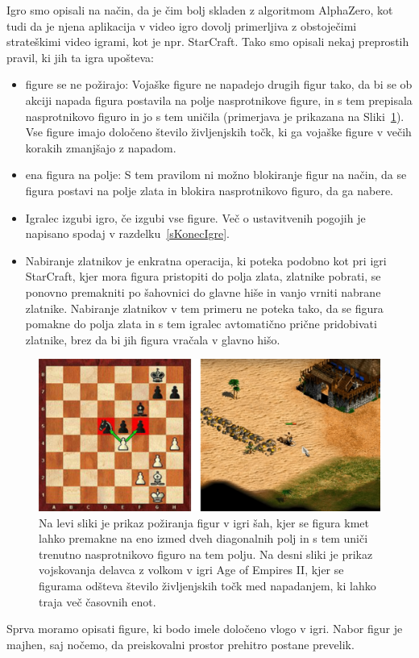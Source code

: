 \documentclass[a4paper, 12pt]{book}
\begin{document}
{Igro smo opisali na način, da je čim bolj skladen z algoritmom AlphaZero, kot tudi da je njena aplikacija v video igro dovolj primerljiva z obstoječimi strateškimi video igrami, kot je npr. StarCraft.
Tako smo opisali nekaj preprostih pravil, ki jih ta igra upošteva:
\begin{itemize}
	\item figure se ne požirajo: Vojaške figure ne napadejo drugih figur tako, da bi se ob akciji napada figura postavila na polje nasprotnikove figure, in s tem prepisala nasprotnikovo figuro in jo s tem uničila (primerjava je prikazana na Sliki~\ref{picPoziranjeFigur}). 
	Vse figure imajo določeno število življenjskih točk, ki ga vojaške figure v večih korakih zmanjšajo z napadom.
	\item ena figura na polje: S tem pravilom ni možno blokiranje figur na način, da se figura postavi na polje zlata in blokira nasprotnikovo figuro, da ga nabere.
	\item Igralec izgubi igro, če izgubi vse figure. Več o ustavitvenih pogojih je napisano spodaj v razdelku~\ref{sKonecIgre}.
	\item Nabiranje zlatnikov je enkratna operacija, ki poteka podobno kot pri igri StarCraft, kjer mora figura pristopiti do polja zlata, zlatnike pobrati, se ponovno premakniti po šahovnici do glavne hiše in vanjo vrniti nabrane zlatnike.
	Nabiranje zlatnikov v tem primeru ne poteka tako, da se figura pomakne do polja zlata in s tem igralec avtomatično prične pridobivati zlatnike, brez da bi jih figura vračala v glavno hišo.
\end{itemize}

\begin{figure}[h!]
	\begin{center}
		\includegraphics[width=1\textwidth]{photos/horizontal_health.pdf}
	\end{center}
	\caption{Na levi sliki je prikaz požiranja figur v igri šah, kjer se figura kmet lahko premakne na eno izmed dveh diagonalnih polj in s tem uniči trenutno nasprotnikovo figuro na tem polju. 
		Na desni sliki je prikaz vojskovanja delavca z volkom v igri Age of Empires II, kjer se figurama odšteva število življenjskih točk med napadanjem, ki lahko traja več časovnih enot. }
	\label{picPoziranjeFigur}
\end{figure}
\noindent
Sprva moramo opisati figure, ki bodo imele določeno vlogo v igri. 
Nabor figur je majhen, saj nočemo, da preiskovalni prostor prehitro postane prevelik.

}
\end{document}
